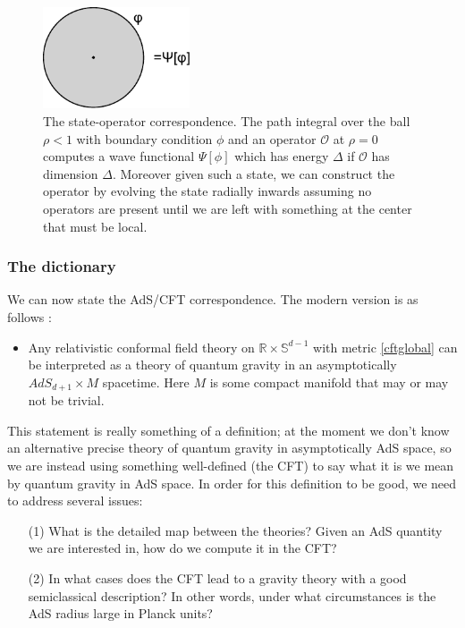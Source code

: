 \documentclass[12pt]{article}
\begin{document}
\begin{figure}
\begin{center}
\includegraphics[height=3cm]{stateop.pdf}
\caption{The state-operator correspondence.  The path integral over the ball $\rho<1$ with boundary condition $\phi$ and an operator $\mathcal{O}$ at $\rho=0$ computes a wave functional $\Psi[\phi]$ which has energy $\Delta$ if $\mathcal{O}$ has dimension $\Delta$.  Moreover given such a state, we can construct the operator by evolving the state radially inwards assuming no operators are present until we are left with something at the center that must be local.  }\label{stateop}
\end{center}
\end{figure}

\subsubsection{The dictionary}
We can now state the AdS/CFT correspondence.  The modern version is as follows \cite{Heemskerk:2009pn}:
\begin{itemize}
\item Any relativistic conformal field theory on $\mathbb{R}\times \mathbb{S}^{d-1}$ with metric \eqref{cftglobal} can be interpreted as a theory of quantum gravity in an asymptotically $AdS_{d+1}\times M$ spacetime.  Here $M$ is some compact manifold that may or may not be trivial.
\end{itemize}
This statement is really something of a definition; at the moment we don't know an alternative precise theory of quantum gravity in asymptotically AdS space, so we are instead using something well-defined (the CFT) to say what it is we mean by quantum gravity in AdS space.  In order for this definition to be good, we need to address several issues:
\begin{itemize}
\item[(1)] What is the detailed map between the theories?  Given an AdS quantity we are interested in, how do we compute it in the CFT?
\item[(2)] In what cases does the CFT lead to a gravity theory with a good semiclassical description?  In other words, under what circumstances is the AdS radius large in Planck units?
\end{itemize}
\end{document}
